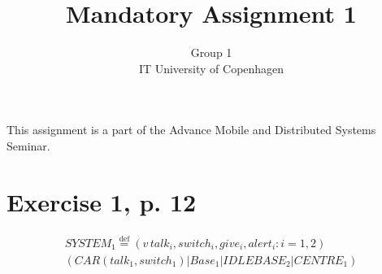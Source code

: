 \documentclass[11pt]{article}
\begin{document}
\title{Mandatory Assignment 1}
\author{Group 1\\
IT University of Copenhagen}
\renewcommand{\today}{September 22, 2012}
\maketitle
This assignment is a part of the Advance Mobile and Distributed Systems Seminar.

\section {Exercise 1, p. 12}

\begin{equation}
\begin{split}
SYSTEM_1 \stackrel{\mathrm{def}}{=} (v\,talk_i , switch_i , give_i , alert_i : i = 1,2) \\
 (CAR(talk_1 , switch_1) | Base_1 | IDLEBASE_2 | CENTRE_1) \\
\end{split}
\end{equation}
\end{document}
